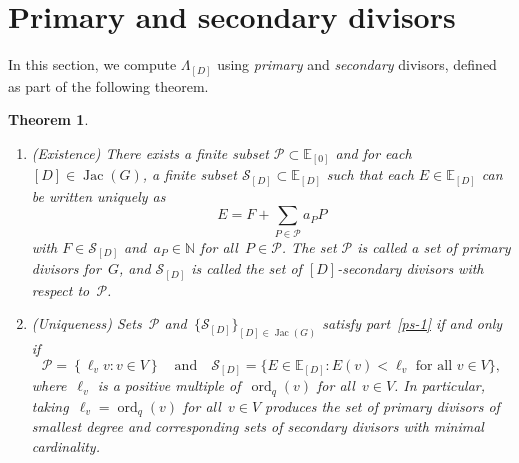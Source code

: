 \documentclass{amsart}
\newtheorem{thm}{Theorem}[section]
\DeclareMathOperator{\Jac}{Jac}
\DeclareMathOperator{\ord}{ord}
\newcommand{\primary}{\mathcal{P}}
\newcommand{\secondary}{\mathcal{S}}
\newcommand{\N}{\mathbb{N}}
\newcommand{\E}{\mathbb{E}}
\newcommand{\tl}{\ell}
\begin{document}
\section{Primary and secondary divisors}\label{sect: primsec}
In this section, we compute $\Lambda_{[D]}$ using \emph{primary} and
\emph{secondary} divisors, defined as part of the following theorem. 

\begin{thm}\label{thm: primary-secondary}\ 
\begin{enumerate}[label=\rm{(\arabic*)},leftmargin=*]
  \item\label{ps-1} {\rm (Existence)} There exists a finite subset
    $\primary\subset\E_{[0]}$ and for each $[D]\in\Jac(G)$, a finite
    subset $\secondary_{[D]}\subset\E_{[D]}$ such
    that each $E\in\E_{[D]}$ can be written uniquely as
\[
E = F + \sum_{P\in\primary}a_P P
\]
with $F\in\secondary_{[D]}$ and~$a_P\in\N$ for all~$P\in\primary$. The set
$\primary$ is called a set of {\em primary divisors} for~$G$,  and
$\secondary_{[D]}$ is called the set of {\em $[D]$-secondary} divisors with
respect to~$\primary$.
\item\label{ps-2} {\rm (Uniqueness)} Sets~$\primary$
  and~$\{\secondary_{[D]}\}_{[D]\in\Jac(G)}$ satisfy part~\ref{ps-1} if and only
  if
  \[
    \primary=\left\{\tl_v v: v\in V\right\}
    \quad\text{and}\quad
    \secondary_{[D]}=\{E\in\E_{[D]}:E(v)<\tl_v \mbox{ for all $v\in
    V$}\},
  \]
  where~$\tl_v$ is a positive multiple of~$\ord_{q}(v)$ for all~$v\in
  V$. In particular, taking~$\ell_v=\ord_q(v)$ for all~$v\in V$ produces the set
  of primary divisors of smallest degree and corresponding sets of secondary
  divisors with minimal cardinality.
\end{enumerate}
\end{thm}
\end{document}
